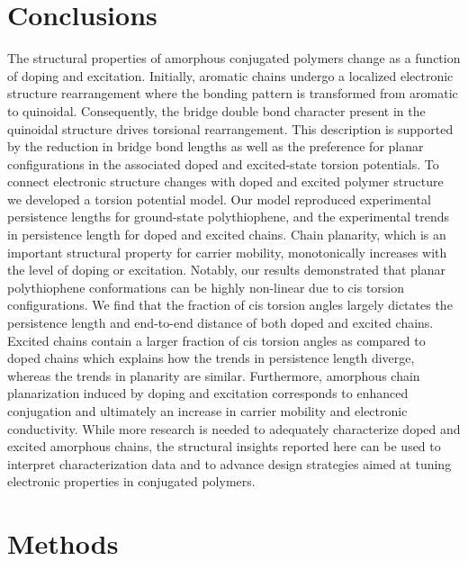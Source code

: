 \section{Conclusions}

The structural properties of amorphous conjugated polymers change as a function of doping and excitation. Initially, aromatic chains undergo a localized electronic structure rearrangement where the bonding pattern is transformed from aromatic to quinoidal. Consequently, the bridge double bond character present in the quinoidal structure drives torsional rearrangement. This description is supported by the reduction in bridge bond lengths as well as the preference for planar configurations in the associated doped and excited-state torsion potentials. To connect electronic structure changes with doped and excited polymer structure we developed a torsion potential model. Our model reproduced experimental persistence lengths for ground-state polythiophene, and the experimental trends in persistence length for doped and excited chains. Chain planarity, which is an important structural property for carrier mobility, monotonically increases with the level of doping or excitation. Notably, our results demonstrated that planar polythiophene conformations can be highly non-linear due to cis torsion configurations. We find that the fraction of cis torsion angles largely dictates the persistence length and end-to-end distance of both doped and excited chains. Excited chains contain a larger fraction of cis torsion angles as compared to doped chains which explains how the trends in persistence length diverge, whereas the trends in planarity are similar. Furthermore, amorphous chain planarization induced by doping and excitation corresponds to enhanced conjugation and ultimately an increase in carrier mobility and electronic conductivity. While more research is needed to adequately characterize doped and excited amorphous chains, the structural insights reported here can be used to interpret characterization data and to advance design strategies aimed at tuning electronic properties in conjugated polymers.

\section{Methods}

